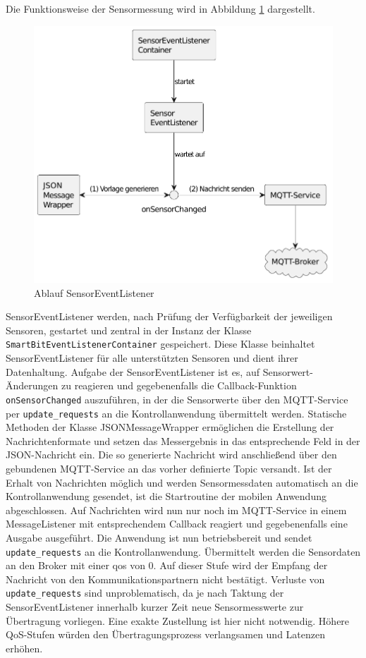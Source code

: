 \documentclass[11pt,a4paper]{report}
\begin{document}
Die Funktionsweise der Sensormessung wird in Abbildung \ref{fig:sensor_event_listener} dargestellt.
\begin{figure}[htbp]
  \centering
  \includegraphics[width=.8\textwidth]{images/sensor_event_listener}
  \caption{Ablauf SensorEventListener}
  \label{fig:sensor_event_listener}
\end{figure}
SensorEventListener werden, nach Prüfung der Verfügbarkeit der jeweiligen Sensoren, gestartet und zentral in der Instanz der Klasse \texttt{SmartBitEventListenerContainer} gespeichert.
Diese Klasse beinhaltet SensorEventListener für alle unterstützten Sensoren und dient ihrer Datenhaltung.
Aufgabe der SensorEventListener ist es, auf Sensorwert-Änderungen zu reagieren und gegebenenfalls die Callback-Funktion \texttt{onSensorChanged} auszuführen, in der die Sensorwerte über den MQTT-Service per \texttt{update\_requests} an die Kontrollanwendung übermittelt werden.
Statische Methoden der Klasse JSONMessageWrapper ermöglichen die Erstellung der Nachrichtenformate und setzen das Messergebnis in das entsprechende Feld in der JSON-Nachricht ein.
Die so generierte Nachricht wird anschließend über den gebundenen MQTT-Service an das vorher definierte Topic versandt.
Ist der Erhalt von Nachrichten möglich und werden Sensormessdaten automatisch an die Kontrollanwendung gesendet, ist die Startroutine der mobilen Anwendung abgeschlossen.
Auf Nachrichten wird nun nur noch im MQTT-Service in einem MessageListener mit entsprechendem Callback reagiert und gegebenenfalls eine Ausgabe ausgeführt.
Die Anwendung ist nun betriebsbereit und sendet \texttt{update\_requests} an die Kontrollanwendung.
Übermittelt werden die Sensordaten an den Broker mit einer \acrfull{qos} von 0.
Auf dieser Stufe wird der Empfang der Nachricht von den Kommunikationspartnern nicht bestätigt.
Verluste von \texttt{update\_requests} sind unproblematisch, da je nach Taktung der SensorEventListener innerhalb kurzer Zeit neue Sensormesswerte zur Übertragung vorliegen.
Eine exakte Zustellung ist hier nicht notwendig.
Höhere QoS-Stufen würden den Übertragungsprozess verlangsamen und Latenzen erhöhen.
\end{document}
